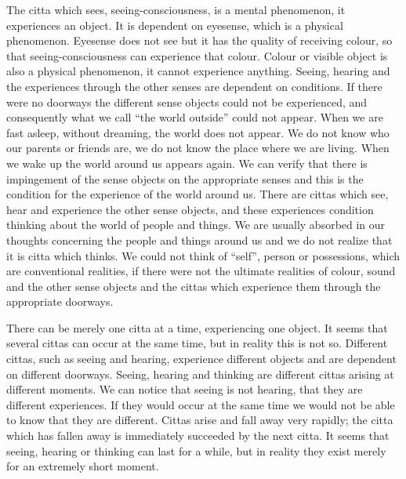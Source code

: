 \documentclass{book}
\begin{document}
The citta which sees, seeing-consciousness, is a mental phenomenon, it
experiences an object. It is dependent on eyesense, which is a physical
phenomenon. Eyesense does not see but it has the quality of receiving
colour, so that seeing-consciousness can experience that colour. Colour
or visible object is also a physical phenomenon, it cannot experience
anything. Seeing, hearing and the experiences through the other senses
are dependent on conditions. If there were no doorways the different
sense objects could not be experienced, and consequently what we call
``the world outside'' could not appear. When we are fast asleep, without
dreaming, the world does not appear. We do not know who our parents or
friends are, we do not know the place where we are living. When we wake
up the world around us appears again. We can verify that there is
impingement of the sense objects on the appropriate senses and this is
the condition for the experience of the world around us. There are
cittas which see, hear and experience the other sense objects, and these
experiences condition thinking about the world of people and things. We
are usually absorbed in our thoughts concerning the people and things
around us and we do not realize that it is citta which thinks. We could
not think of ``self'', person or possessions, which are conventional
realities, if there were not the ultimate realities of colour, sound and
the other sense objects and the cittas which experience them through the
appropriate doorways.

There can be merely one citta at a time, experiencing one object. It
seems that several cittas can occur at the same time, but in reality
this is not so. Different cittas, such as seeing and hearing, experience
different objects and are dependent on different doorways. Seeing,
hearing and thinking are different cittas arising at different moments.
We can notice that seeing is not hearing, that they are different
experiences. If they would occur at the same time we would not be able
to know that they are different. Cittas arise and fall away very
rapidly; the citta which has fallen away is immediately succeeded by the
next citta. It seems that seeing, hearing or thinking can last for a
while, but in reality they exist merely for an extremely short moment.
\end{document}
